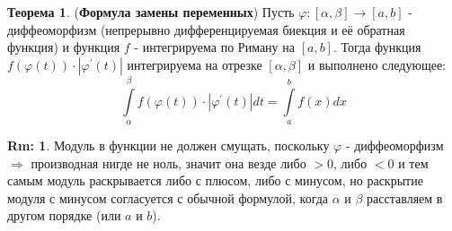 \documentclass[12pt]{article}
\theoremstyle{definition}
\newtheorem{rem}{Rm:}
\newtheorem{theorem}{Теорема}
\newcommand{\ddint}[2]{\displaystyle\int\limits_{#1}^{#2}}
\begin{document}
\begin{theorem}(\textbf{Формула замены переменных})
	Пусть $\varphi \colon [\alpha,\beta] \to [a,b]$ - диффеоморфизм (непрерывно дифференцируемая биекция и её обратная функция) и функция $f$ - интегрируема по Риману на $[a,b]$. Тогда функция $f\left(\varphi(t)\right){\cdot}|\varphi^\prime(t)|$ интегрируема на отрезке $[\alpha, \beta]$ и выполнено следующее:
	$$
		\ddint{\alpha}{\beta}f\left(\varphi(t)\right){\cdot}|\varphi^\prime(t)|dt = \ddint{a}{b}f(x)dx
	$$
\end{theorem}
\begin{rem}
	Модуль в функции не должен смущать, поскольку $\varphi$ - диффеоморфизм $\Rightarrow$ производная нигде не ноль, значит она везде либо $> 0$, либо $< 0$ и тем самым модуль раскрывается либо с плюсом, либо с минусом, но раскрытие модуля с минусом согласуется с обычной формулой, когда $\alpha$ и $\beta$ расставляем в другом порядке (или $a$ и $b$).
\end{rem}
\end{document}
